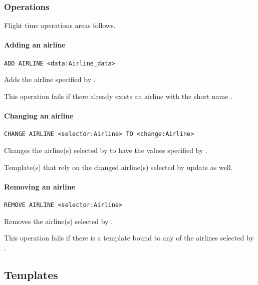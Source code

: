\subsubsection{Operations}
Flight time operations areas follows.

\paragraph{Adding an airline}
\begin{operation}
  \lstinline{ADD AIRLINE <data:Airline_data>}
\end{operation}
Adds the airline specified by .

This operation fails if there already exists an airline with the short name
.

\paragraph{Changing an airline}
\begin{operation}
  \lstinline{CHANGE AIRLINE <selector:Airline> TO <change:Airline>}
\end{operation}
Changes the airline(s) selected by  to have the values specified
by .

Template(s) that rely on the changed airline(s) selected by 
update as well.

\paragraph{Removing an airline}
\begin{operation}
  \lstinline{REMOVE AIRLINE <selector:Airline>}
\end{operation}
Removes the airline(s) selected by .

This operation fails if there is a template bound to any of the airlines
selected by .


\subsection{Templates}
